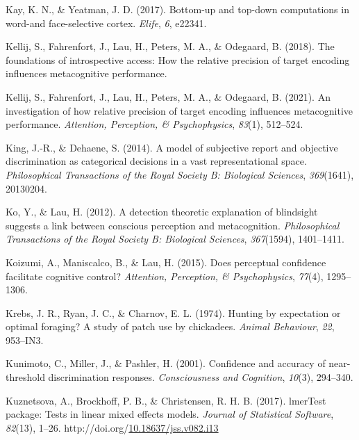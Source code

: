 \documentclass[12pt,twoside]{reedthesis}
\newenvironment{CSLReferences}%
  {}%
  {\par}
\begin{document}
\begin{CSLReferences}{1}{0}
\leavevmode\hypertarget{ref-kay2017bottom}{}%
Kay, K. N., \& Yeatman, J. D. (2017). Bottom-up and top-down computations in word-and face-selective cortex. \emph{Elife}, \emph{6}, e22341.

\leavevmode\hypertarget{ref-kellij2018foundations}{}%
Kellij, S., Fahrenfort, J., Lau, H., Peters, M. A., \& Odegaard, B. (2018). The foundations of introspective access: How the relative precision of target encoding influences metacognitive performance.

\leavevmode\hypertarget{ref-kellij2021investigation}{}%
Kellij, S., Fahrenfort, J., Lau, H., Peters, M. A., \& Odegaard, B. (2021). An investigation of how relative precision of target encoding influences metacognitive performance. \emph{Attention, Perception, \& Psychophysics}, \emph{83}(1), 512--524.

\leavevmode\hypertarget{ref-king2014model}{}%
King, J.-R., \& Dehaene, S. (2014). A model of subjective report and objective discrimination as categorical decisions in a vast representational space. \emph{Philosophical Transactions of the Royal Society B: Biological Sciences}, \emph{369}(1641), 20130204.

\leavevmode\hypertarget{ref-ko2012detection}{}%
Ko, Y., \& Lau, H. (2012). A detection theoretic explanation of blindsight suggests a link between conscious perception and metacognition. \emph{Philosophical Transactions of the Royal Society B: Biological Sciences}, \emph{367}(1594), 1401--1411.

\leavevmode\hypertarget{ref-koizumi2015does}{}%
Koizumi, A., Maniscalco, B., \& Lau, H. (2015). Does perceptual confidence facilitate cognitive control? \emph{Attention, Perception, \& Psychophysics}, \emph{77}(4), 1295--1306.

\leavevmode\hypertarget{ref-krebs1974hunting}{}%
Krebs, J. R., Ryan, J. C., \& Charnov, E. L. (1974). Hunting by expectation or optimal foraging? A study of patch use by chickadees. \emph{Animal Behaviour}, \emph{22}, 953--IN3.

\leavevmode\hypertarget{ref-kunimoto2001confidence}{}%
Kunimoto, C., Miller, J., \& Pashler, H. (2001). Confidence and accuracy of near-threshold discrimination responses. \emph{Consciousness and Cognition}, \emph{10}(3), 294--340.

\leavevmode\hypertarget{ref-R-lmerTest}{}%
Kuznetsova, A., Brockhoff, P. B., \& Christensen, R. H. B. (2017). {lmerTest} package: Tests in linear mixed effects models. \emph{Journal of Statistical Software}, \emph{82}(13), 1--26. http://doi.org/\href{https://doi.org/10.18637/jss.v082.i13}{10.18637/jss.v082.i13}


\end{CSLReferences}
\end{document}
